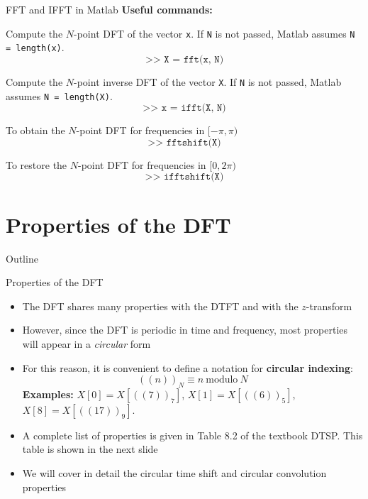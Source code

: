 \documentclass[10pt]{beamer}
\begin{document}
\begin{frame}{FFT and IFFT in Matlab}
	\textbf{Useful commands:}
	
	Compute the $N$-point DFT of the vector \texttt{x}. If \texttt{N} is not passed, Matlab assumes \texttt{N = length(x)}.
	\begin{equation*}
		\texttt{>> X = fft(x, N)}
	\end{equation*}
		
	Compute the $N$-point inverse DFT of the vector \texttt{X}. If \texttt{N} is not passed, Matlab assumes \texttt{N = length(X)}.
	\begin{equation*}
	\texttt{>> x = ifft(X, N)}
	\end{equation*}
	
	To obtain the $N$-point DFT for frequencies in $[-\pi, \pi)$
	\begin{equation*}
	\texttt{>> fftshift(X)}
	\end{equation*}
	
	To restore the $N$-point DFT for frequencies in $[0, 2\pi)$
	\begin{equation*}
	\texttt{>> ifftshift(X)}
	\end{equation*}
	
\end{frame}

%
\section{Properties of the DFT}
\begin{frame}{Outline}
	\tableofcontents[currentsection]
\end{frame}
\begin{frame}{Properties of the DFT}
	\begin{itemize}
		\item The DFT shares many properties with the DTFT and with the $z$-transform
		\item However, since the DFT is periodic in time and frequency, most properties will appear in a \textit{circular} form
		\item For this reason, it is convenient to define a notation for \textbf{circular indexing}:
		\begin{equation*}
			((n))_N \equiv n~\text{modulo}~N
		\end{equation*}
		\textbf{Examples:} $X[0] = X[((7))_7]$, $X[1] = X[((6))_5]$, $X[8] = X[((17))_9]$.
		
		\item A complete list of properties is given in Table 8.2 of the textbook DTSP. This table is shown in the next slide
		\item We will cover in detail the circular time shift and circular convolution properties
	\end{itemize}
\end{frame}
\end{document}
